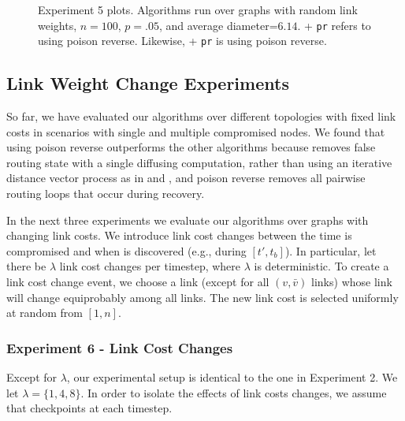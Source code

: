 \begin{figure*}[t]
\centering
\caption{Experiment 5 plots.  Algorithms run over \er graphs with random link weights, $n=100$, $p=.05$, and average diameter=$6.14$. 
\second + {\tt pr} refers to \second using poison reverse. Likewise, \cpr + {\tt pr} is \cpr using poison reverse.}
\label{fig:pr-fix}
\end{figure*}




\subsection{Link Weight Change Experiments}
\label{subsec:change}

So far, we have evaluated our algorithms over different topologies with fixed link costs in scenarios with single and multiple compromised nodes.
We found that \cpr using poison reverse outperforms the other algorithms because \cpr removes false
routing state with a single diffusing computation, rather than using an iterative distance vector process as in \second and \purges, and poison reverse removes
all pairwise routing loops that occur during \cpr recovery. 

In the next three experiments we evaluate our algorithms over graphs with changing link costs. We introduce link cost changes between the time \bad is compromised and when \bad is discovered 
(e.g., during $[t',t_b]$). 
In particular, let there be $\lambda$ link cost changes per timestep, where $\lambda$ is deterministic. 
To create a link cost change event, we choose a link (except for all $(v,\bar{v})$ links) whose link will change equiprobably among all links. 
The new link cost is selected uniformly at random from $[1,n]$. 

\subsubsection{Experiment 6 - Link Cost Changes}

Except for $\lambda$, our experimental setup is identical to the one in Experiment 2. We let $\lambda = \{1,4,8\}$. In order to isolate the effects of link costs changes,
we assume that \cpr checkpoints at each timestep.

